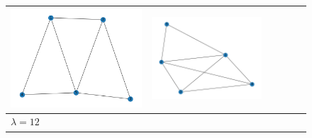 \documentclass[11pt,a4paper,openright,oneside]{book}
\numberwithin{equation}{section}
\begin{document}
{\begin{figure}[h]
\begin{adjustwidth}{-3cm}{-3cm}
\begin{tabular}{>{\centering\arraybackslash}m{1.5cm} m{2.5cm} m{2.5cm} m{2.5cm} m{2.5cm} m{2.5cm}}
        \rule{0pt}{0.01cm} \includegraphics[width=\linewidth]{media/tnale/graph-4-tnale-8.png} \rule{0pt}{0.01cm}&
        \rule{0pt}{0.01cm} \includegraphics[width=\linewidth]{media/tnale/graph-5-tnale-8.png} \rule{0pt}{0.01cm}\\ \hline
        $\lambda = 12$ &

\end{tabular}
\end{adjustwidth}
\end{figure}}
\end{document}
